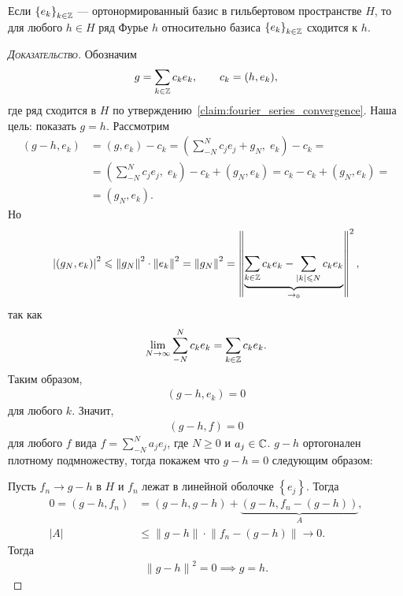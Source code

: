 \documentclass[../complex-analysis.tex]{subfiles}
\begin{document}
\begin{thm}
 Если $ \left\{e_k\right\}_{k \in \mathbb{Z}}  $ --- ортонормированный базис в гильбертовом пространстве $ H $, то для любого $ h \in H$ ряд Фурье $ h $ относительно базиса $ \left\{e_k\right\}_{k\in\mathbb{Z}}  $ сходится к $ h $.
\end{thm}
\begin{proof}[\normalfont\textsc{Доказательство}]
 Обозначим
 \begin{align*}
  g = \sum_{k\in\mathbb{Z}}c_ke_k,\qquad c_k=(h,e_k),
 \end{align*} где ряд сходится в $ H $ по утверждению~\ref{claim:fourier_series_convergence}. Наша цель: показать $ g=h $. Рассмотрим
 \begin{align*}
  (g-h,e_k) &= (g,e_k) - c_k = \left(\sum_{-N}^{N}c_je_j + g_N,\; e_k \right) - c_k = \\
  &= \left( \sum_{-N}^{N}c_je_j,\;e_k \right) - c_k + (g_N,e_k) = c_k - c_k + (g_N,e_k) = \\
  &= (g_N,e_k).
 \end{align*} Но
 \begin{align*}
  \left| (g_N,e_k) \right|^{2} \leqslant \left\| g_N \right\|^{2} \cdot \left\| e_k \right\|^{2} = \left\| g_N \right\|^{2} = \left\| \underbrace{\sum_{k\in\mathbb{Z}}c_ke_k - \sum_{\left| k \right| \leqslant N} c_ke_k}_{\to_0} \right\|^{2},
 \end{align*} так как
 \begin{align*}
  \lim_{N \to \infty} \sum_{-N}^{N}c_ke_k = \sum_{k\in\mathbb{Z}}c_ke_k.
 \end{align*} Таким образом,
 \begin{align*}
  (g-h,e_k) = 0
 \end{align*} для любого $ k $. Значит,
 \begin{align*}
  (g-h,f) = 0
 \end{align*} для любого $ f $ вида $ f = \sum_{-N}^{N}a_je_j$, где $ N\geqslant 0 $ и $ a_j \in \mathbb{C} $. $ g-h $ ортогонален плотному подмножеству, тогда покажем что $g-h=0 $ следующим образом:

 Пусть $ f_n \to g-h $ в $ H $ и $ f_n $ лежат в линейной оболочке $ \left\{e_j\right\} $. Тогда
 \begin{align*}
  0 = (g-h,f_n) &= (g-h,g-h) + \underbrace{(g-h,f_n - (g-h))}_A, \\
  \left| A \right| &\leqslant \left\| g-h \right\| \cdot \left\| f_n - (g-h) \right\| \to 0.
 \end{align*} Тогда
 \begin{align*}
  \left\| g-h \right\|^{2} = 0 \implies g = h.
 \end{align*}
\end{proof}
\end{document}
